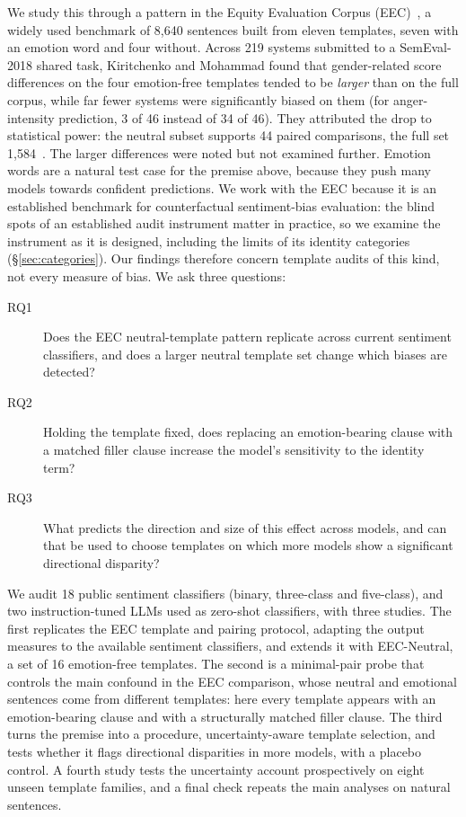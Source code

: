 \documentclass[runningheads]{llncs}
\begin{document}
We study this through a pattern in the Equity Evaluation Corpus
(EEC)~\cite{kiritchenko2018}, a widely used benchmark of 8,640 sentences built
from eleven templates, seven with an emotion word and four without. Across 219
systems submitted to a SemEval-2018 shared task, Kiritchenko and Mohammad found
that gender-related score differences on the four emotion-free templates tended
to be \emph{larger} than on the full corpus, while far fewer systems were
significantly biased on them (for anger-intensity prediction, 3 of 46 instead
of 34 of 46). They attributed the drop to statistical power: the neutral subset
supports 44 paired comparisons, the full set 1,584~\cite[Sec.~5.1]{kiritchenko2018}.
The larger differences were noted but not examined further. Emotion words are a
natural test case for the premise above, because they push many models towards
confident predictions. We work with the EEC because it is an established
benchmark for counterfactual sentiment-bias evaluation: the blind spots of an
established audit instrument matter in practice, so we examine the instrument as
it is designed, including the
limits of its identity categories (\S\ref{sec:categories}). Our findings
therefore concern template audits of this kind, not every measure of bias. We
ask three questions:
\begin{description}
  \item[RQ1] Does the EEC neutral-template pattern replicate across current
  sentiment classifiers, and does a larger neutral template set change which
  biases are detected?
  \item[RQ2] Holding the template fixed, does replacing an emotion-bearing
  clause with a matched filler clause increase the model's sensitivity to the
  identity term?
  \item[RQ3] What predicts the direction and size of this effect across models,
  and can that be used to choose templates on which more models show a
  significant directional disparity?
\end{description}

We audit 18 public sentiment classifiers (binary, three-class and five-class),
and two instruction-tuned LLMs used as zero-shot classifiers, with three
studies. The first replicates the EEC template and pairing protocol, adapting
the output measures to the available sentiment classifiers, and extends it with
EEC-Neutral, a set of 16 emotion-free templates. The second is a minimal-pair
probe that controls the main confound in the EEC comparison, whose neutral and
emotional sentences come from different templates: here every template appears
with an emotion-bearing clause and with a structurally matched filler clause.
The third turns the premise into a procedure, uncertainty-aware template
selection, and tests whether it flags directional disparities in more models, with a placebo
control. A fourth study tests the uncertainty account prospectively on eight
unseen template families, and a final check repeats the main analyses on
natural sentences.
\end{document}
